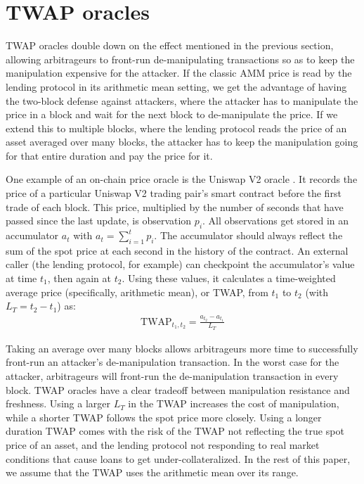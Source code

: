 \section{TWAP oracles}
TWAP oracles double down on the effect mentioned in the previous section, allowing arbitrageurs to front-run de-manipulating transactions so as to keep the manipulation expensive for the attacker. If the classic AMM price is read by the lending protocol in its arithmetic mean setting, we get the advantage of having the two-block defense against attackers, where the attacker has to manipulate the price in a block and wait for the next block to de-manipulate the price. If we extend this to multiple blocks, where the lending protocol reads the price of an asset averaged over many blocks, the attacker has to keep the manipulation going for that entire duration and pay the price for it.

One example of an on-chain price oracle is the Uniswap V2 oracle \cite{Adams2020UniV2}. It records the price of a particular Uniswap V2 trading pair's smart contract before the first trade of each block. This price, multiplied by the number of seconds that have passed since the last update, is observation $p_i$. All observations get stored in an accumulator $a_t$ with $a_t = \sum_{i=1}^{t}p_i$. The accumulator should always reflect the sum of the spot price at each second in the history of the contract.
An external caller (the lending protocol, for example) can checkpoint the accumulator's value at time $t_1$, then again at $t_2$. Using these values, it calculates a time-weighted average price (specifically, arithmetic mean), or TWAP, from $t_1$ to $t_2$ (with $L_T = t_2 - t_1$) as:
\begin{align*}
    \text{TWAP}_{t_1,t_2} = \frac{a_{t_2} - a_{t_1}}{L_T} 
\end{align*}

Taking an average over many blocks allows arbitrageurs more time to successfully front-run an attacker's de-manipulation transaction. In the worst case for the attacker, arbitrageurs will front-run the de-manipulation transaction in every block. TWAP oracles have a clear tradeoff between manipulation resistance and freshness. Using a larger $L_T$ in the TWAP increases the cost of manipulation, while a shorter TWAP follows the spot price more closely. Using a longer duration TWAP comes with the risk of the TWAP not reflecting the true spot price of an asset, and the lending protocol not responding to real market conditions that cause loans to get under-collateralized. In the rest of this paper, we assume that the TWAP uses the arithmetic mean over its range. 

